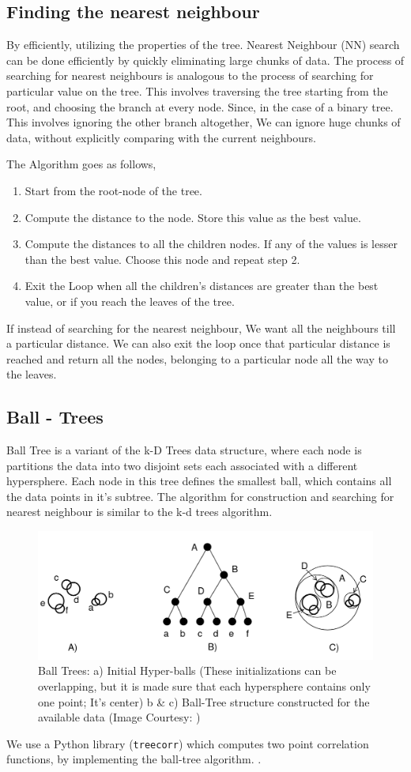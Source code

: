 \subsection{Finding the nearest neighbour}
By efficiently, utilizing the properties of the tree. Nearest Neighbour (NN) search can be done efficiently by quickly eliminating
large chunks of data. The process of searching for nearest neighbours is analogous to the process of searching for particular value on the tree.
This involves traversing the tree starting from the root, and choosing the branch at every node. Since, in the case of a binary  tree. This involves ignoring
the other branch altogether, We can ignore huge chunks of data, without explicitly comparing with the current neighbours. 

The Algorithm goes as follows, 
\begin{enumerate}
\item Start from the root-node of the tree.
\item Compute the distance to the node. Store this value as the best value.
\item Compute the distances to all the children nodes. If any of the values is lesser than the best value. Choose this node and repeat step 2.
\item Exit the Loop when all the children's distances are greater than the best value, or if you reach the leaves of the tree.
\end{enumerate}
If instead of searching for the nearest neighbour, We want all the neighbours till a particular distance. We can also exit the loop once that particular
distance is reached and return all the nodes, belonging to a particular node all the way to the leaves.


\subsection{Ball - Trees}
Ball Tree is a variant of the k-D Trees data structure, where each node is partitions the data into two disjoint sets each associated with a different
hypersphere. Each node in this tree defines the smallest ball, which contains all the data points in it's subtree. The algorithm for construction and searching
for nearest neighbour is similar to the k-d trees algorithm. 
\begin{figure}[htbp]
  \centering
  \includegraphics[width=0.5\linewidth]{ball_trees.png}
  \caption{Ball Trees: a) Initial Hyper-balls (These initializations can be overlapping, but it is made sure that each
    hypersphere contains only one point; It's center)
    b \& c) Ball-Tree structure constructed for the available data (Image Courtesy: \cite{balltree})}
\end{figure}
We use a Python library (\texttt{treecorr}) which computes two point correlation functions, by implementing the ball-tree algorithm. \cite{treecorr}.


